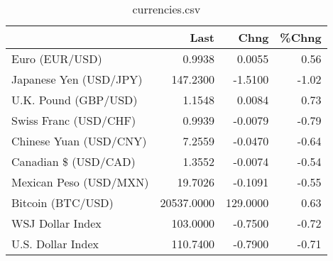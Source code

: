 \documentclass{article}%
\begin{document}
%


\begin{table}[htbp]%
\caption{currencies.csv}%
\centering%
\begin{adjustbox}{width=1\textwidth}%
\begin{tabular}{lrrr}
\toprule
                       &       Last &     Chng &  \%Chng \\
\midrule
        Euro (EUR/USD) &     0.9938 &   0.0055 &   0.56 \\
Japanese Yen (USD/JPY) &   147.2300 &  -1.5100 &  -1.02 \\
  U.K. Pound (GBP/USD) &     1.1548 &   0.0084 &   0.73 \\
 Swiss Franc (USD/CHF) &     0.9939 &  -0.0079 &  -0.79 \\
Chinese Yuan (USD/CNY) &     7.2559 &  -0.0470 &  -0.64 \\
  Canadian \$ (USD/CAD) &     1.3552 &  -0.0074 &  -0.54 \\
Mexican Peso (USD/MXN) &    19.7026 &  -0.1091 &  -0.55 \\
     Bitcoin (BTC/USD) & 20537.0000 & 129.0000 &   0.63 \\
      WSJ Dollar Index &   103.0000 &  -0.7500 &  -0.72 \\
     U.S. Dollar Index &   110.7400 &  -0.7900 &  -0.71 \\
\bottomrule
\end{tabular}
%
\end{adjustbox}%
\end{table}

%
\end{document}

